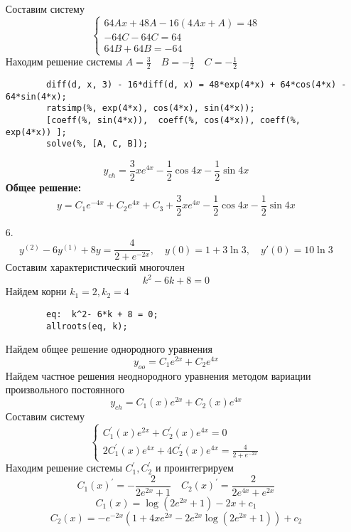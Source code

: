\documentclass[a4paper, 12pt, oneside]{scrartcl}
\begin{document}
\begin{enumerate}
		Составим систему \\
		\begin{equation*}
		  \begin{cases}
   			64Ax + 48A - 16(4Ax + A) = 48 \\
   			-64C - 64C = 64 \\
   			64B + 64B = -64	
   			\end{cases}
		\end{equation*}
		Находим решение системы $A = \frac{3}{2} \quad B = -\frac{1}{2} \quad C = -\frac{1}{2} $ \\
		\begin{verbatim}
		diff(d, x, 3) - 16*diff(d, x) = 48*exp(4*x) + 64*cos(4*x) - 64*sin(4*x);
		ratsimp(%, exp(4*x), cos(4*x), sin(4*x));
    	[coeff(%, sin(4*x)),  coeff(%, cos(4*x)), coeff(%, exp(4*x)) ];
		solve(%, [A, C, B]);
		\end{verbatim} 

		$$ y_{ch} = \frac{3}{2}xe^{4x} -\frac{1}{2}\cos{4x} -\frac{1}{2}\sin{4x}   $$
		\textbf{Общее решение: }
		$$ y = C_{1}e^{-4x} + C_{2}e^{4x} + C_{3} + \frac{3}{2}xe^{4x} -\frac{1}{2}\cos{4x} -\frac{1}{2}\sin{4x} $$


		\item[6.]
		$$ y^{(2)} - 6y^{(1)} + 8y = \frac{4}{2 + e^{-2x}}, \quad y(0) = 1 + 3\ln{3}, \quad y'(0) = 10\ln{3} $$
		Составим характеристический многочлен \\
		$$ k^{2} - 6k + 8 = 0 $$
		Найдем корни $ k_{1} = 2, k_{2} = 4 $ \\
		\begin{verbatim}
		eq:  k^2- 6*k + 8 = 0; 
		allroots(eq, k);
		\end{verbatim}

		Найдем общее решение однородного уравнения \\
		$$ y_{oo} = C_{1}e^{2x} + C_{2}e^{4x} $$
		Найдем частное решения неоднородного уравнения методом вариации произвольного постоянного
		$$ y_{ch} =  C_{1}(x)e^{2x} + C_{2}(x)e^{4x} $$
		Составим систему \\
		\begin{equation*}
		  \begin{cases}
   			C_{1}^{'}(x)e^{2x} + C_{2}^{'}(x)e^{4x} = 0 \\
   			2C_{1}^{'}(x)e^{4x} + 4C_{2}^{'}(x)e^{4x} = \frac{4}{2 + e^{-2x}}  
   			\end{cases}
		\end{equation*}
		Находим решение системы $C_{1}^{'}, C_{2}^{'} $ и проинтегрируем \\
		$$ C_1(x)^{'} = -\frac{2}{2e^{2x}+1} \quad C_2(x)^{'} = \frac{2}{2e^{4x} + e^{2x}} $$
		$$ C_1(x) = \log{(2e^{2x}+1)} - 2x + c_1 $$
		$$ C_2(x) = -e^{-2x}(1+4xe^{2x} - 2e^{2x}\log{(2e^{2x}+1)}) + c_2 $$


\end{enumerate}
\end{document}
